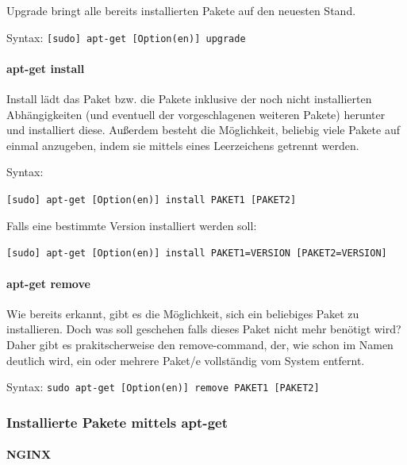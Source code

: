 Upgrade bringt alle bereits installierten Pakete auf den neuesten Stand.

Syntax: \texttt{{[}sudo{]}\ apt-get\ {[}Option(en){]}\ upgrade}

\hypertarget{apt-get-install}{%
\paragraph{apt-get install}\label{apt-get-install}}

Install lädt das Paket bzw. die Pakete inklusive der noch nicht
installierten Abhängigkeiten (und eventuell der vorgeschlagenen weiteren
Pakete) herunter und installiert diese. Außerdem besteht die
Möglichkeit, beliebig viele Pakete auf einmal anzugeben, indem sie
mittels eines Leerzeichens getrennt werden.

Syntax:

\texttt{{[}sudo{]}\ apt-get\ {[}Option(en){]}\ install\ PAKET1\ {[}PAKET2{]}}

Falls eine bestimmte Version installiert werden soll:

\texttt{{[}sudo{]}\ apt-get\ {[}Option(en){]}\ install\ PAKET1=VERSION\ {[}PAKET2=VERSION{]}}

\hypertarget{apt-get-remove}{%
\paragraph{apt-get remove}\label{apt-get-remove}}

Wie bereits erkannt, gibt es die Möglichkeit, sich ein beliebiges Paket
zu installieren. Doch was soll geschehen falls dieses Paket nicht mehr
benötigt wird? Daher gibt es prakitscherweise den remove-command, der,
wie schon im Namen deutlich wird, ein oder mehrere Paket/e vollständig
vom System entfernt.

Syntax:
\texttt{sudo\ apt-get\ {[}Option(en){]}\ remove\ PAKET1\ {[}PAKET2{]}}

\hypertarget{installierte-pakete-mittels-apt-get}{%
\subsubsection{Installierte Pakete mittels
apt-get}\label{installierte-pakete-mittels-apt-get}}

\hypertarget{nginx}{%
\paragraph{NGINX}\label{nginx}}

